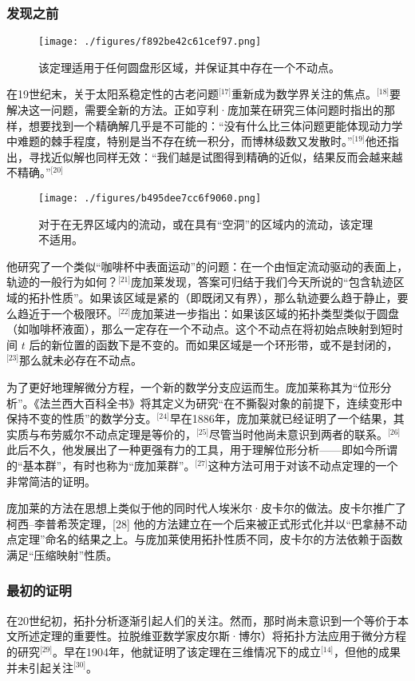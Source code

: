 \subsubsection{发现之前}
\begin{figure}[ht]
\centering
\texttt{[image: ./figures/f892be42c61cef97.png]}
\caption{该定理适用于任何圆盘形区域，并保证其中存在一个不动点。} \label{fig_BLWRbd_2}
\end{figure}
在19世纪末，关于太阳系稳定性的古老问题\(^\text{[17]}\)重新成为数学界关注的焦点。\(^\text{[18]}\)要解决这一问题，需要全新的方法。正如亨利·庞加莱在研究三体问题时指出的那样，想要找到一个精确解几乎是不可能的：“没有什么比三体问题更能体现动力学中难题的棘手程度，特别是当不存在统一积分，而博林级数又发散时。”\(^\text{[19]}\)他还指出，寻找近似解也同样无效：“我们越是试图得到精确的近似，结果反而会越来越不精确。”\(^\text{[20]}\)
\begin{figure}[ht]
\centering
\texttt{[image: ./figures/b495dee7cc6f9060.png]}
\caption{对于在无界区域内的流动，或在具有“空洞”的区域内的流动，该定理不适用。} \label{fig_BLWRbd_3}
\end{figure}
他研究了一个类似“咖啡杯中表面运动”的问题：在一个由恒定流动驱动的表面上，轨迹的一般行为如何？\(^\text{[21]}\)庞加莱发现，答案可归结于我们今天所说的“包含轨迹区域的拓扑性质”。如果该区域是紧的（即既闭又有界），那么轨迹要么趋于静止，要么趋近于一个极限环。\(^\text{[22]}\)庞加莱进一步指出：如果该区域的拓扑类型类似于圆盘（如咖啡杯液面），那么一定存在一个不动点。这个不动点在将初始点映射到短时间 $t$ 后的新位置的函数下是不变的。而如果区域是一个环形带，或不是封闭的，\(^\text{[23]}\)那么就未必存在不动点。

为了更好地理解微分方程，一个新的数学分支应运而生。庞加莱称其为“位形分析”。《法兰西大百科全书》将其定义为研究“在不撕裂对象的前提下，连续变形中保持不变的性质”的数学分支。\(^\text{[24]}\)早在1886年，庞加莱就已经证明了一个结果，其实质与布劳威尔不动点定理是等价的，\(^\text{[25]}\)尽管当时他尚未意识到两者的联系。\(^\text{[26]}\)此后不久，他发展出了一种更强有力的工具，用于理解位形分析——即如今所谓的“基本群”，有时也称为“庞加莱群”。\(^\text{[27]}\)这种方法可用于对该不动点定理的一个非常简洁的证明。

庞加莱的方法在思想上类似于他的同时代人埃米尔·皮卡尔的做法。皮卡尔推广了柯西–李普希茨定理，[28] 他的方法建立在一个后来被正式形式化并以“巴拿赫不动点定理”命名的结果之上。与庞加莱使用拓扑性质不同，皮卡尔的方法依赖于函数满足“压缩映射”性质。
\subsubsection{最初的证明}
在20世纪初，拓扑分析逐渐引起人们的关注。然而，那时尚未意识到一个等价于本文所述定理的重要性。拉脱维亚数学家皮尔斯·博尔）将拓扑方法应用于微分方程的研究\(^\text{[29]}\)。早在1904年，他就证明了该定理在三维情况下的成立\(^\text{[14]}\)，但他的成果并未引起关注\(^\text{[30]}\)。


